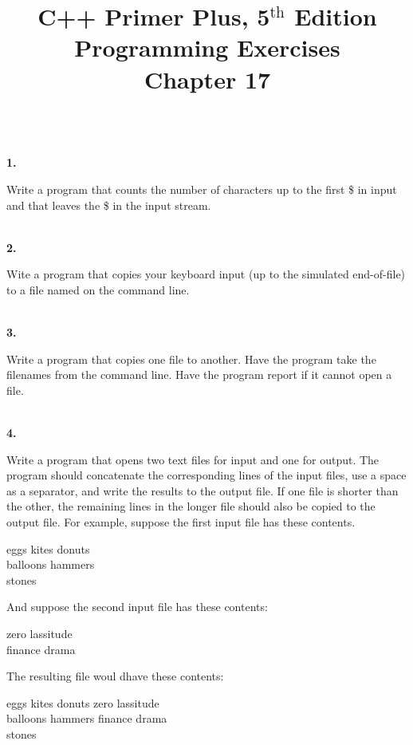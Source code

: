 \documentclass[10 pt]{amsart}
\newlength{\cwidth}
\newenvironment{cpart}[2][\cwidth]
	{%
		\\ %
		\textbf{#2. }%
		\begin{minipage}[t]{#1}%
		\setlength{\parindent}{0pt}%
		\setlength{\parskip}{2ex}%
	}
	{%
		\end{minipage}%
	}
\newcommand{\ChapNum}{17}
\begin{document}
	\title
	[Chapter \ChapNum]
	{C++ Primer Plus, 5$^\text{th}$ Edition \\
	Programming Exercises \\
	Chapter \ChapNum}

	\maketitle

	\begin{cpart}{1}
		Write a program that counts the number of characters up to the
		first \$ in input and that leaves the \$ in the input stream.
	\end{cpart}

	\begin{cpart}{2}
		Wite a program that copies your keyboard input (up to the simulated
		end-of-file) to a file named on the command line.
	\end{cpart}

	\begin{cpart}{3}
		Write a program that copies one file to another.
		Have the program take the filenames from the command line.
		Have the program report if it cannot open a file.
	\end{cpart}

	\begin{cpart}{4}
		Write a program that opens two text files for input and one for
		output.
		The program should concatenate the corresponding lines of the
		input files, use a space as a separator,
		and write the results to the output file.
		If one file is shorter than the other, the remaining
		lines in the longer file should also be copied to the output file.
		For example, suppose the first input file has these contents.

		{\ttfamily
			eggs kites donuts \\
			balloons hammers \\
			stones
		}

		And suppose the second input file has these contents:

		{\ttfamily
			zero lassitude \\
			finance drama
		}

		The resulting file woul dhave these contents: 
		
		{\ttfamily
			eggs kites donuts zero lassitude \\
			balloons hammers finance drama \\
			stones
		}
	\end{cpart}
\end{document}
